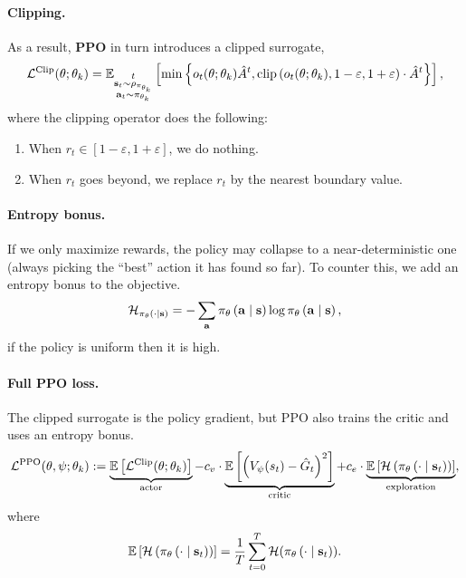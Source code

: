 \documentclass[11pt]{article}  %
\begin{document}
\paragraph{Clipping.} As a result, \textbf{PPO} in turn introduces a clipped surrogate,
\begin{align*}
  \mathcal{L}^{\text{Clip}}(\theta; \theta_k) = \mathbb{E}_{\substack{t \\ \mathbf{s}_t \sim \rho_{\pi_{\theta_k}} \\ \mathbf{a}_t \sim \pi_{\theta_k}}}\left[\min\left\{ o_t(\theta; \theta_k) \hat{A}^t, \text{clip}\left( o_t(\theta; \theta_k), 1-\varepsilon, 1+\varepsilon \right)\cdot\hat{A}^t \right\}\right],
\end{align*}
where the clipping operator does the following:
\begin{enumerate}
  \item When $r_t \in [1 - \varepsilon, 1 + \varepsilon]$, we do nothing.
  \item When $r_t$ goes beyond, we replace $r_t$ by the nearest boundary value.
\end{enumerate}

\paragraph{Entropy bonus.}
If we only maximize rewards, the policy may collapse to a near-deterministic one (always picking the “best” action it has found so far).
To counter this, we add an entropy bonus to the objective.
\begin{align*}
  \mathcal{H}_{\pi_{\theta}\left( \cdot \mid \mathbf{s} \right)} = -\sum_{\mathbf{a}} \pi_{\theta}\left( \mathbf{a} \mid \mathbf{s} \right) \log \pi_{\theta}\left( \mathbf{a} \mid \mathbf{s} \right),
\end{align*}
if the policy is uniform then it is high.


\paragraph{Full PPO loss.}
The clipped surrogate is the policy gradient, but PPO also trains the critic and uses an entropy bonus.
\begin{align*}
  \mathcal{L}^{\text{PPO}}(\theta, \psi; \theta_k) := \underbrace{\mathbb{E}\left[\mathcal{L}^{\text{Clip}}(\theta; \theta_k)\right]}_{\text{actor}} - c_v \cdot \underbrace{\mathbb{E}\left[\left( V_{\psi}(s_t) - \hat{G}_t \right)^2\right]}_{\text{critic}} + c_e \cdot \underbrace{\mathbb{E}\left[\mathcal{H}\left( \pi_{\theta}\left( \cdot \mid \mathbf{s}_t \right) \right)\right]}_{\text{exploration}},
\end{align*}
where 
\begin{align*}
  \mathbb{E}\left[\mathcal{H}\left( \pi_{\theta}\left( \cdot \mid \mathbf{s}_t \right) \right)\right] = \frac{1}{T}\sum_{t=0}^{T}\mathcal{H}(\pi_{\theta}\left( \cdot \mid \mathbf{s}_t \right)).
\end{align*}
\end{document}
